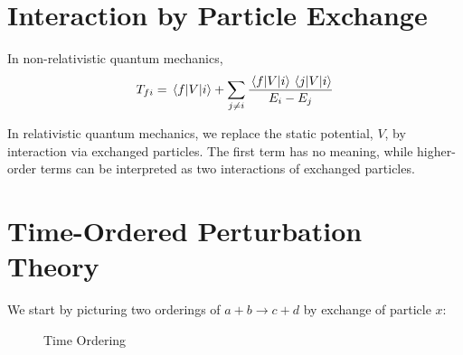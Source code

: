 \documentclass[a4paper,twoside,master.tex]{subfiles}
\begin{document}
\section{Interaction by Particle Exchange}\label{sec:interaction_by_particle_exchange}

In non-relativistic quantum mechanics,
\begin{equation}
    T_{fi} = \mel{f}{V}{i} + \sum_{j \neq i} \frac{\mel{f}{V}{i} \mel{j}{V}{i}}{E_i - E_j}
\end{equation}

In relativistic quantum mechanics, we replace the static potential, $ V $, by interaction via exchanged particles. The first term has no meaning, while higher-order terms can be interpreted as two interactions of exchanged particles.

\section{Time-Ordered Perturbation Theory}\label{sec:time-ordered_perturbation_theory}

We start by picturing two orderings of $ a+b \to c+d $ by exchange of particle $ x $:

\begin{figure}[ht]
    \centering
    \caption{Time Ordering}\label{fig:time-ordering}
\end{figure}
\end{document}
